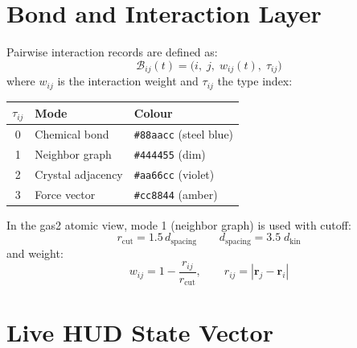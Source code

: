 ﻿\documentclass[11pt]{article}
\begin{document}
\section{Bond and Interaction Layer}
\label{sec:bonds}

Pairwise interaction records are defined as:
\begin{equation}
  \mathcal{B}_{ij}(t) = \bigl(i,\;j,\;w_{ij}(t),\;\tau_{ij}\bigr)
\end{equation}
where $w_{ij}$ is the interaction weight and $\tau_{ij}$ the type index:

\begin{center}
\begin{tabular}{cll}
\toprule
$\tau_{ij}$ & Mode & Colour \\
\midrule
0 & Chemical bond & \texttt{\#88aacc} (steel blue) \\
1 & Neighbor graph & \texttt{\#444455} (dim) \\
2 & Crystal adjacency & \texttt{\#aa66cc} (violet) \\
3 & Force vector & \texttt{\#cc8844} (amber) \\
\bottomrule
\end{tabular}
\end{center}

\noindent
In the gas2 atomic view, mode 1 (neighbor graph) is used with cutoff:
\begin{equation}
  r_\mathrm{cut} = 1.5\,d_{\mathrm{spacing}}
  \qquad
  d_{\mathrm{spacing}} = 3.5\;d_{\mathrm{kin}}
\end{equation}
and weight:
\begin{equation}
  w_{ij} = 1 - \frac{r_{ij}}{r_\mathrm{cut}}, \qquad r_{ij} = |\mathbf{r}_j - \mathbf{r}_i|
\end{equation}

\section{Live HUD State Vector}
\label{sec:hud}
\end{document}
